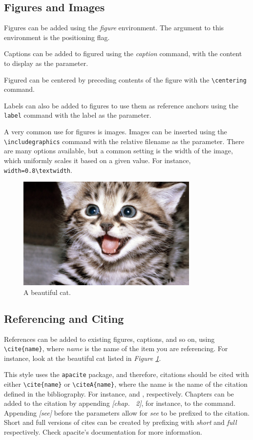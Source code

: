 \subsection{Figures and Images}
Figures can be added using the \textit{figure} environment.  The argument to this environment is the positioning flag.

Captions can be added to figured using the \textit{caption} command, with the content to display as the parameter.

Figured can be centered by preceding contents of the figure with the \verb;\centering; command.

Labels can also be added to figures to use them as reference anchors using the \verb;label; command with the label as the parameter.

A very common use for figures is images.  Images can be inserted using the \verb;\includegraphics; command with the relative filename as the parameter.  There are many options available, but a common setting is the width of the image, which uniformly scales it based on a given value.  For instance, \verb;width=0.8\textwidth;.
\begin{figure}[H]
	\centering
	\includegraphics[width=0.8\textwidth]{figures/cat.jpg}
	\caption{A beautiful cat.}
	\label{fig:beautiful_cat}
\end{figure}

\subsection{Referencing and Citing}
References can be added to existing figures, captions, and so on, using \verb;\cite{name};, where \textit{name} is the name of the item you are referencing.  For instance, look at the beautiful cat listed in \textit{Figure \ref{fig:beautiful_cat}}.

This style uses the \verb;apacite; package, and therefore, citations should be cited with either \verb;\cite{name}; or \verb;\citeA{name};, where the name is the name of the citation defined in the bibliography.  For instance, \cite{gamma1994design} and , respectively.  Chapters can be added to the citation by appending \textit{[chap. ~2]}, for instance, to the command.  Appending \textit{[see]} before the parameters allow for \textit{see} to be prefixed to the citation.  Short and full versions of cites can be created by prefixing with \textit{short} and \textit{full} respectively.  Check apacite's documentation for more information.


